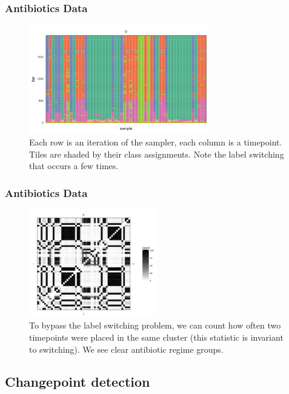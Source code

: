 \documentclass{beamer}
\begin{document}
\begin{frame}
  \frametitle{Antibiotics Data}
\begin{figure}[ht]
  \centering
  \includegraphics[width=0.7\textwidth]{figure/abt_states}
  \caption{Each row is an iteration of the sampler, each column is a timepoint.
    Tiles are shaded by their class assignments. Note the label switching that
    occurs a few times. \label{fig:abt_states} }
\end{figure}
\end{frame}

\begin{frame}
  \frametitle{Antibiotics Data}
\begin{figure}[ht]
  \centering
  \includegraphics[width=0.5\textwidth]{figure/abt_cooccurrence}
  \caption{To bypass the label switching problem, we can count how often two
    timepoints were placed in the same cluster (this statistic is invariant to
    switching). We see clear antibiotic regime groups. \label{afig:abt_states}}
\end{figure}
\end{frame}

\subsection{Changepoint detection}
\label{subsec:changpoint}
\end{document}
